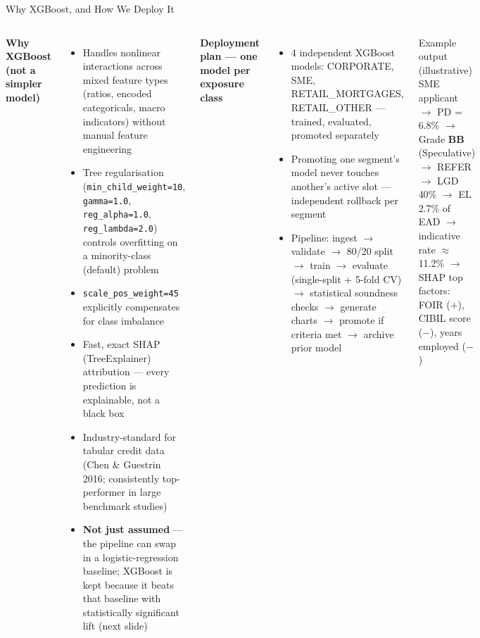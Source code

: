 \documentclass[9pt,aspectratio=169]{beamer}
\begin{document}
\begin{frame}{Why XGBoost, and How We Deploy It}
\vspace{-3pt}
\begin{columns}[T]
    \footnotesize\textbf{Why XGBoost (not a simpler model)}
    \begin{itemize}\setlength\itemsep{2pt}\footnotesize
      \item[\small$\bullet$] Handles nonlinear interactions across mixed feature types
            (ratios, encoded categoricals, macro indicators) without manual feature engineering
      \item[\small$\bullet$] Tree regularisation (\texttt{min\_child\_weight=10}, \texttt{gamma=1.0},
            \texttt{reg\_alpha=1.0}, \texttt{reg\_lambda=2.0}) controls overfitting on a
            minority-class (default) problem
      \item[\small$\bullet$] \texttt{scale\_pos\_weight=45} explicitly compensates for class imbalance
      \item[\small$\bullet$] Fast, exact SHAP (TreeExplainer) attribution --- every prediction is
            explainable, not a black box
      \item[\small$\bullet$] Industry-standard for tabular credit data (Chen \& Guestrin 2016;
            consistently top-performer in large benchmark studies)
      \item[\small$\bullet$] \textbf{Not just assumed} --- the pipeline can swap in a logistic-regression
            baseline; XGBoost is kept because it beats that baseline with statistically
            significant lift (next slide)
    \end{itemize}

    \footnotesize\textbf{Deployment plan --- one model per exposure class}
    \begin{itemize}\setlength\itemsep{2pt}\footnotesize
      \item[\small$\bullet$] 4 independent XGBoost models: CORPORATE, SME, RETAIL\_MORTGAGES,
            RETAIL\_OTHER --- trained, evaluated, promoted separately
      \item[\small$\bullet$] Promoting one segment's model never touches another's active
            slot --- independent rollback per segment
      \item[\small$\bullet$] Pipeline: ingest $\to$ validate $\to$ 80/20 split $\to$ train
            $\to$ evaluate (single-split + 5-fold CV) $\to$ statistical soundness checks
            $\to$ generate charts $\to$ promote if criteria met $\to$ archive prior model
    \end{itemize}
    \vspace{6pt}
    \begin{alertblock}{Example output (illustrative)}
      \scriptsize
      SME applicant $\to$ PD = 6.8\% $\to$ Grade \textbf{BB} (Speculative) $\to$ REFER
      $\to$ LGD 40\% $\to$ EL 2.7\% of EAD $\to$ indicative rate $\approx$ 11.2\%
      $\to$ SHAP top factors: FOIR (+), CIBIL score ($-$), years employed ($-$)
    \end{alertblock}
\end{columns}
\end{frame}
\end{document}
